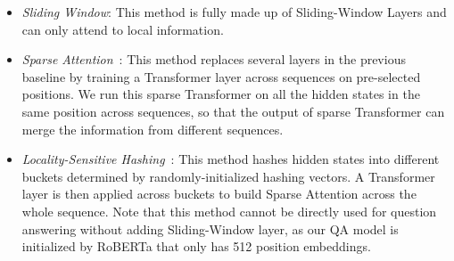 \documentclass[11pt,a4paper]{article}
\begin{document}
\begin{itemize}[itemsep=-5pt,topsep=2pt,leftmargin=12pt]
\item \textit{Sliding Window}: This method is fully made up of Sliding-Window Layers and can only attend to local information.

\item \textit{Sparse Attention}~\cite{sparsetransf}: This method replaces several layers in the previous baseline by training a Transformer layer across sequences on pre-selected positions. We run this sparse Transformer on all the hidden states in the same position across sequences, so that the output of sparse Transformer can merge the information from different sequences.

\item \textit{Locality-Sensitive Hashing}~\cite{reformer}:  This method hashes hidden states into different buckets determined by randomly-initialized hashing vectors.
A Transformer layer is then applied across buckets to build Sparse Attention across the whole sequence.
Note that this method cannot be directly used for question answering without adding Sliding-Window layer, as our QA model is initialized by RoBERTa that only has 512 position embeddings.
\end{itemize}
\end{document}
